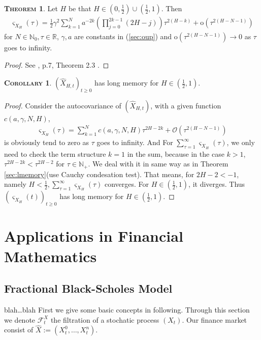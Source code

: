 \documentclass[a4paper, twoside, 11pt]{article}
\theoremstyle{definition}
\newtheorem{theorem}[definition]{\scshape Theorem}
\newtheorem{corollary}[definition]{\scshape Corollary}
\newcommand{\brkt}[1]{\left({#1} \right)}
\begin{document}
\begin{theorem}
  Let $H$ be that $H\in (0, \frac{1}{2}) \cup (\frac{1}{2}, 1)$. Then
  \begin{eqnarray*}
	\varsigma_{X_{H}}(\tau) = \frac{1}{2} \gamma^2 \sum_{k=1}^{N} a^{-2k}\brkt{\prod_{j=0}^{2k-1}(2H-j)}\tau^{2(H-k)} + \mathrm{o}(\tau^{2(H-N-1)})
\end{eqnarray*}
for $N \in \mathbb{N}_{0}, \tau\in\mathbb{R}$, $\gamma, a$ are constants in (\ref{sec:oup}) and $\mathrm{o}(\tau^{2(H-N-1)}) \rightarrow 0 $ as $\tau$ goes to infinity.
  \label{sec:autocov}
\end{theorem}
\begin{proof}
  See \cite{chriel}, p.7, Theorem 2.3 .
\end{proof}

\begin{corollary}
  $(\hat{X}_{H,t})_{t\ge 0}$ has long memory for $H\in (\frac{1}{2}, 1)$.
  \label{sec:longmer}
\end{corollary}
\begin{proof}
  Consider the autocovariance of $(\hat{X}_{H,t})$, with a given function $c(a, \gamma, N, H)$,
  \begin{eqnarray*}
	\varsigma_{X_{H}}(\tau) = \sum_{k=1}^N c(a, \gamma, N, H) \tau^{2H-2k} + \mathcal{O}(\tau^{2(H-N-1)})
  \end{eqnarray*}
  is obviously tend to zero as $\tau$ goes to infinity. And For $\sum_{\tau=1}^{\infty} \varsigma_{X_{H}}(\tau)$, we only need to check the term structure $k=1$ in the sum, because in the case $k>1$, $\tau^{2H-2k} < \tau^{2H-2}$ for $\tau\in\mathbb{N}_{+}$. We deal with it in same way as in Theorem \ref{sec:lmemory}(use Cauchy condesation test). That means, for $2H-2< -1$, namely $H<\frac{1}{2}, \sum_{\tau=1}^{\infty} \varsigma_{X_{H}}(\tau)$ converges. For $H\in (\frac{1}{2}, 1)$, it diverges. Thus $(\varsigma_{X_{H}}(t))_{t\ge 0}$ has long memory for $H\in(\frac{1}{2}, 1)$.
\end{proof}
\newpage

\section{Applications in Financial Mathematics}
\setcounter{equation}{0}
\subsection{Fractional Black-Scholes Model}
blah\dots blah
First we give some basic concepts in following. Through this section we denote $\mathcal{F}^X_t$ the filtration of a stochatic process $(X_t)$. Our finance market consist of $\hat{X}:=(X_t^0,\dots, X_t^n)$.
\end{document}
